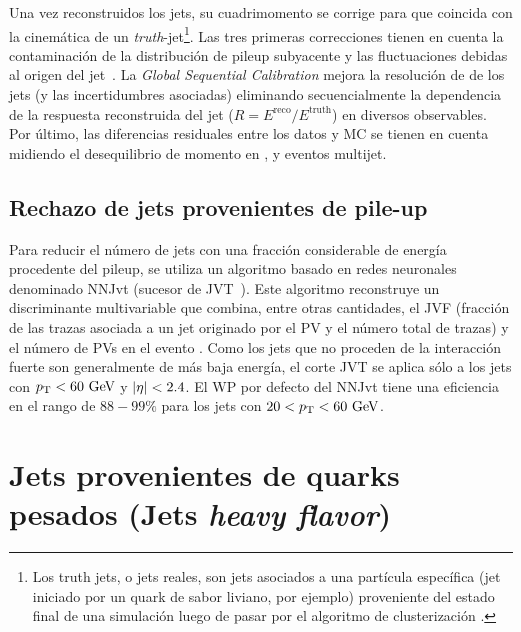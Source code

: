 Una vez reconstruidos los jets, su cuadrimomento se corrige para que coincida con la cinemática de un \textit{truth}-jet\footnote{Los truth jets, o jets reales, son jets asociados a una partícula específica (jet iniciado por un quark de sabor liviano, por ejemplo) proveniente del estado final de una simulación luego de pasar por el algoritmo de clusterización \antikt.}. Las tres primeras correcciones tienen en cuenta la contaminación de la distribución de pileup subyacente y las fluctuaciones debidas al origen del jet~\cite{ATLAS-Jet-Calibration-Run2}. La \textit{Global Sequential Calibration} mejora la resolución de \pt de los jets (y las incertidumbres asociadas) eliminando secuencialmente la dependencia de la respuesta reconstruida del jet (\(R= E^{\text{reco}} / E^{\text{truth}}\)) en diversos observables. Por último, las diferencias residuales entre los datos y \ac{MC} se tienen en cuenta midiendo el desequilibrio de momento en \Zjets, \gammajet y eventos multijet.

\subsection{Rechazo de jets provenientes de pile-up}

Para reducir el número de jets con una fracción considerable de energía procedente del pileup, se utiliza un algoritmo basado en redes neuronales denominado \ac{NNJvt} (sucesor de \ac{JVT}~\cite{ATLAS-JetPileup-Run1}). Este algoritmo reconstruye un discriminante multivariable que combina, entre otras cantidades, el \ac{JVF} (fracción de las trazas \pt asociada a un jet originado por el \ac{PV} y el número total de trazas) y el número de \acp{PV} en el evento \Npv. Como los jets que no proceden de la interacción fuerte son generalmente de más baja energía, el corte \ac{JVT} se aplica sólo a los jets con \(p_{\text{T}}<60~\text{GeV}\) y \(|\eta|<2.4\). El \ac{WP} por defecto del \ac{NNJvt} tiene una eficiencia en el rango de \(88-99\%\) para los jets con \(20<p_{\text{T}}<60~\text{GeV}\).


















\section{Jets provenientes de quarks pesados (Jets \textit{heavy flavor})}
\label{sec:objects:ftag}

